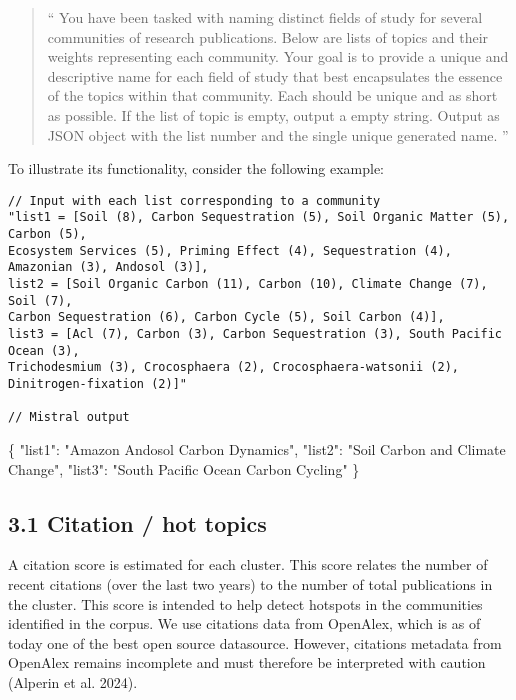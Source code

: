 \documentclass[
]{article}
\newenvironment{Shaded}{}{}
\newcommand{\DataTypeTok}[1]{\textcolor[rgb]{0.56,0.13,0.00}{#1}}
\newcommand{\FunctionTok}[1]{\textcolor[rgb]{0.02,0.16,0.49}{#1}}
\newcommand{\StringTok}[1]{\textcolor[rgb]{0.25,0.44,0.63}{#1}}
\begin{document}
\begin{quote}
`` You have been tasked with naming distinct fields of study for several
communities of research publications. Below are lists of topics and
their weights representing each community. Your goal is to provide a
unique and descriptive name for each field of study that best
encapsulates the essence of the topics within that community. Each
should be unique and as short as possible. If the list of topic is
empty, output a empty string. Output as JSON object with the list number
and the single unique generated name. ''
\end{quote}

To illustrate its functionality, consider the following example:

\begin{verbatim}
// Input with each list corresponding to a community
"list1 = [Soil (8), Carbon Sequestration (5), Soil Organic Matter (5), Carbon (5),  
Ecosystem Services (5), Priming Effect (4), Sequestration (4), Amazonian (3), Andosol (3)],  
list2 = [Soil Organic Carbon (11), Carbon (10), Climate Change (7), Soil (7),  
Carbon Sequestration (6), Carbon Cycle (5), Soil Carbon (4)],  
list3 = [Acl (7), Carbon (3), Carbon Sequestration (3), South Pacific Ocean (3),  
Trichodesmium (3), Crocosphaera (2), Crocosphaera-watsonii (2), Dinitrogen-fixation (2)]"

// Mistral output
\end{verbatim}

\begin{Shaded}
\begin{Highlighting}[]
\FunctionTok{\{}
  \DataTypeTok{"list1"}\FunctionTok{:} \StringTok{"Amazon Andosol Carbon Dynamics"}\FunctionTok{,}
  \DataTypeTok{"list2"}\FunctionTok{:} \StringTok{"Soil Carbon and Climate Change"}\FunctionTok{,}
  \DataTypeTok{"list3"}\FunctionTok{:} \StringTok{"South Pacific Ocean Carbon Cycling"}
\FunctionTok{\}}
\end{Highlighting}
\end{Shaded}

\hypertarget{citation-hot-topics}{%
\subsection{3.1 Citation / hot topics}\label{citation-hot-topics}}

A citation score is estimated for each cluster. This score relates the
number of recent citations (over the last two years) to the number of
total publications in the cluster. This score is intended to help detect
hotspots in the communities identified in the corpus. We use citations
data from OpenAlex, which is as of today one of the best open source
datasource. However, citations metadata from OpenAlex remains incomplete
and must therefore be interpreted with caution (Alperin et al. 2024).
\end{document}
